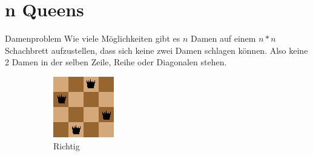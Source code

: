 \documentclass[aspectratio=43,t]{beamer}
\begin{document}
  \section{n Queens}
    \begin{frame}{Damenproblem}
      Wie viele Möglichkeiten gibt es $n$ Damen auf einem $n * n$ Schachbrett aufzustellen, dass sich keine zwei Damen schlagen können.
      Also keine 2 Damen in der selben Zeile, Reihe oder Diagonalen stehen.
      \begin{figure}[h!]
        \centering
        \begin{subfigure}{0.4\linewidth}
          \includegraphics[width=\linewidth]{../img/queensRight.png}
          \caption{Richtig}
        \end{subfigure}
        \begin{subfigure}{0.4\linewidth}

\end{subfigure}
\end{figure}
\end{frame}
\end{document}
